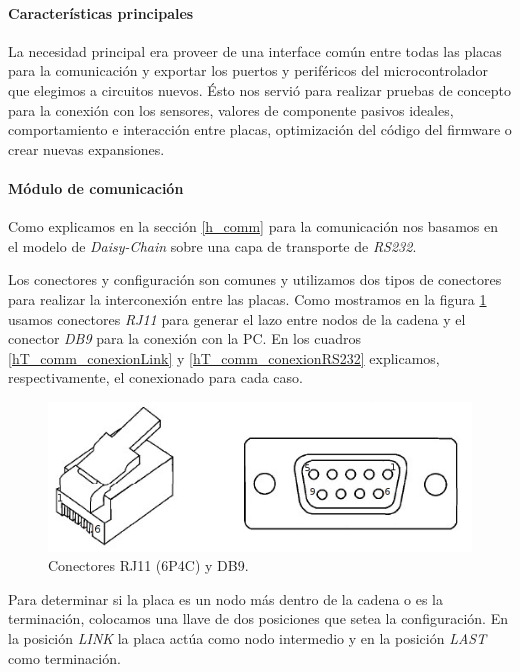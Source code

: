 \paragraph{Caracter\'isticas principales}
\label{h_placas_generica_caracteristicas}

La necesidad principal era proveer de una interface com\'un entre todas las placas para la comunicaci\'on y exportar
los puertos y perif\'ericos del microcontrolador que elegimos a circuitos nuevos.
\'Esto nos servi\'o para realizar pruebas de concepto para la conexi\'on con los sensores, valores de componente pasivos
ideales, comportamiento e interacci\'on entre placas, optimizaci\'on del c\'odigo del firmware o crear nuevas expansiones.

\paragraph{M\'odulo de comunicaci\'on}
\label{h_placas_generica_comm}

Como explicamos en la secci\'on \ref{h_comm} para la comunicaci\'on nos basamos en el modelo de \emph{Daisy-Chain} sobre una
capa de transporte de \emph{RS232}.

Los conectores y configuraci\'on son comunes y utilizamos dos tipos de conectores para realizar la interconexi\'on entre las placas.
Como mostramos en la figura \ref{hF_placa_gen_comm} usamos conectores \emph{RJ11} para generar el lazo entre nodos de la cadena y el
conector \emph{DB9} para la conexi\'on con la PC.
En los cuadros \ref{hT_comm_conexionLink} y \ref{hT_comm_conexionRS232} explicamos, respectivamente, el conexionado para cada caso.

\begin{figure}[h]
	\centering
	\includegraphics[scale=.25]{figuras/rj11_db9.png}
	\caption{Conectores RJ11 (6P4C) y DB9.}
	\label{hF_placa_gen_comm}
\end{figure}

Para determinar si la placa es un nodo m\'as dentro de la cadena o es la terminaci\'on, colocamos una llave de dos posiciones
que setea la configuraci\'on.
En la posici\'on \emph{LINK} la placa act\'ua como nodo intermedio y en la posici\'on \emph{LAST} como terminaci\'on.

